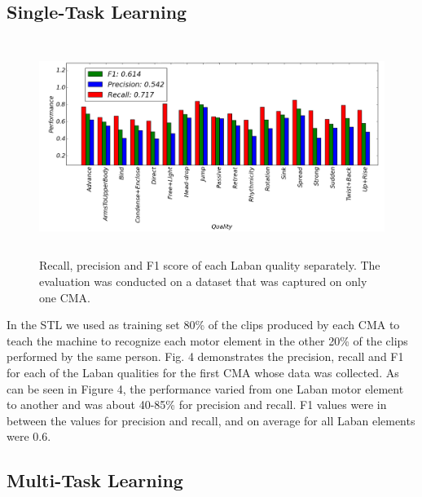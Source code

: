 \subsection{Single-Task Learning}
\begin{figure}
	\centering
	\includegraphics[width=\textwidth, height=70mm]{graphics/Laban/oneCMAFinalWithoutTitle.png}
	\caption{Recall, precision and F1 score of each Laban quality separately. The
	evaluation was conducted on a dataset that was captured on only one CMA.}
	\label{oneCMAFinal}
\end{figure}
In the STL we used as training set 80\% of the clips produced by each CMA to
 teach the machine to recognize each motor element in the other 20\% of the
 clips performed by the same person. Fig. 4 demonstrates the precision, recall
 and F1 for each of the Laban qualities for the first CMA whose data was
 collected. As can be seen in Figure 4, the performance varied from one Laban
 motor element to another and was about 40-85\% for precision and recall. F1
 values were in between the values for precision and recall, and on average for
 all Laban elements were 0.6.
\subsection{Multi-Task Learning}
